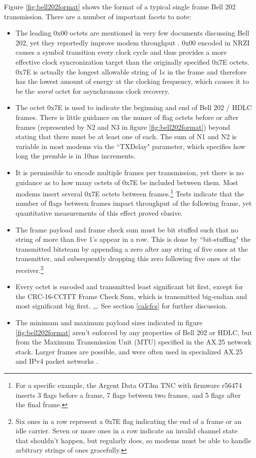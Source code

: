 \documentclass[12pt,letterpaper]{article}
\begin{document}
Figure \ref{fig:bell202format} shows the format of a typical single frame
Bell 202 transmission. There are a number of important facets to note:
\begin{itemize}
	\item The leading 0x00 octets are mentioned in very few documents
		discussing Bell 202, yet they reportedly improve modem
		throughput \cite{millerinterview}\cite{aprsunveiled}. 
		0x00 encoded in NRZI causes a symbol transition
		every clock cycle and thus provides a more effective clock 
		syncronization target than the originally specified 0x7E octets. 
		0x7E is actually 
		the longest allowable string of 1s in the frame and 
		therefore has the lowest amount of energy at the clocking frequency,
		which causes it to be the \emph{worst} 
		octet for asynchronous clock recovery.
	\item The octet 0x7E is used to indicate the beginning and end of 
		Bell 202 / HDLC frames.
		There is little guidance on the numer of flag octets before
		or after frames (represented by N2 and N3 in 
		figure \ref{fig:bell202format})
		beyond stating that there must be at least one of each. The sum of
		N1 and N2 is variable in most modems via the ``TXDelay" parameter,
		which specifies how long the premble is in 10ms increments.
	\item It is permissible to encode multiple 
		frames per transmission, yet there is no guidance as to how
		many octets of 0x7E be included between them.
		Most modems insert several 0x7E octets between 
		frames.\footnote{For a specific example, the Argent Data OT3m TNC 
			with firmware r56474 inserts 3 flags before
		a frame, 7 flags between two frames, and 5 flags after the final frame.}
		Tests indicate that the number of flags between frames 
		impact throughput of the following frame, yet
		quantitative measurements of this effect proved elusive.
	\item The frame payload and frame check sum must be bit stuffed such 
		that no string of more than five 1's appear in a row.
		This is done by ``bit-stuffing" the transmitted bitsteam by
		appending a zero after any string of five ones at the transmitter,
		and subsequently dropping this zero following five ones at the 
		receiver.\footnote{Six ones in a row represent a 0x7E flag indicating 
			the end of a frame or an idle carrier.
			Seven or more ones in a row indicate an invalid channel state
			that shouldn't happen, but regularly does, so modems must be 
			able to handle arbitrary strings of ones gracefully.}
	\item Every octet is encoded and transmitted least significant bit first,
		except for the CRC-16-CCITT Frame Check Sum, 
		which is transmitted big-endian
		and most significant big first.
		\cite{n1vgphy},\cite[\S8.1.1-2]{ituv42},\cite[\S3.8]{ax25spec}.
		See section \ref{calcfcs} for further discussion.
	\item The minimum and maximum payload sizes indicated in figure 
		\ref{fig:bell202format} aren't enforced by any properties of 
		Bell 202 or HDLC, but from the Maximum Transmission Unit (MTU)
		specified in the AX.25 network stack.
		Larger frames are possible, and were often used in specialized 
		AX.25 and IPv4 packet networks \cite{pattersoninterview}.


\end{itemize}
\end{document}
